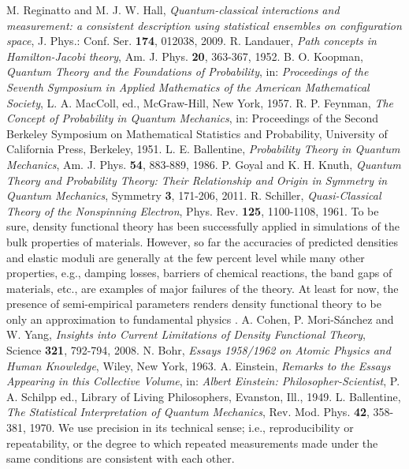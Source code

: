 \documentclass [12pt]{revtex4}
\begin{document}
\begin{thebibliography}{99}
 M. Reginatto and M. J. W. Hall, {\it Quantum-classical interactions and measurement: a consistent description using statistical ensembles on configuration space}, J. Phys.: Conf. Ser. \textbf{174}, 012038, 2009.
 R. Landauer, {\it Path concepts in Hamilton-Jacobi theory}, Am. J. Phys. \textbf{20}, 363-367, 1952.
 B. O. Koopman, {\it Quantum Theory and the Foundations of Probability}, in: {\it Proceedings of the Seventh Symposium in Applied Mathematics of the American Mathematical Society}, L. A. MacColl, ed., McGraw-Hill, New York, 1957.
 R. P. Feynman, {\it The Concept of Probability in Quantum Mechanics}, in: {Proceedings of the Second Berkeley Symposium on Mathematical Statistics and Probability}, University of California Press, Berkeley, 1951.
 L. E. Ballentine, {\it Probability Theory in Quantum Mechanics}, Am. J. Phys. \textbf{54}, 883-889, 1986.
 P. Goyal and K. H. Knuth, {\it Quantum Theory and Probability Theory: Their Relationship and Origin in Symmetry in Quantum Mechanics}, Symmetry \textbf{3}, 171-206, 2011.
 R. Schiller, {\it Quasi-Classical Theory of the Nonspinning Electron}, Phys. Rev. \textbf{125}, 1100-1108, 1961.
 To be sure, density functional theory has been successfully applied in simulations of the bulk properties of materials.  However, so far the accuracies of predicted densities and elastic moduli are generally at the few percent level while many other properties, e.g., damping losses, barriers of chemical reactions, the band gaps of materials, etc., are examples of major failures of the theory. At least for now, the presence of semi-empirical parameters renders density functional theory to be only an approximation to fundamental physics \cite{CMSY2008}.
 A. Cohen, P. Mori-S\'{a}nchez and W. Yang, {\it Insights into Current Limitations of Density Functional Theory}, Science \textbf{321}, 792-794, 2008.
 N. Bohr, {\it Essays 1958/1962 on Atomic Physics and Human Knowledge}, Wiley, New York, 1963.
 A. Einstein, {\it Remarks to the Essays Appearing in this Collective Volume}, in: {\it Albert Einstein: Philosopher-Scientist}, P. A. Schilpp ed., Library of Living Philosophers, Evanston, Ill., 1949.
 L. Ballentine, {\it The Statistical Interpretation of Quantum Mechanics}, Rev. Mod. Phys. \textbf{42}, 358-381, 1970.
 We use precision in its technical sense; i.e., reproducibility or repeatability, or the degree to which repeated measurements made under the same conditions are consistent with each other.

\end{thebibliography}
\end{document}
